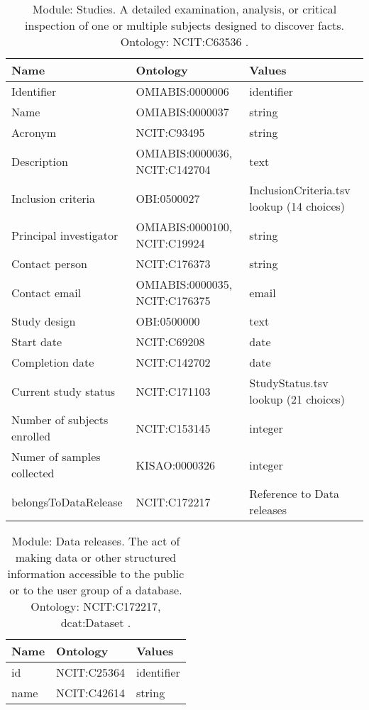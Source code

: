 \documentclass{article}
\begin{document}
\begin{table}[htb]
\begin{tabular}{lll}
Name & Ontology & Values \\
\hline
Identifier & OMIABIS:0000006  & identifier \\
Name & OMIABIS:0000037  & string \\
Acronym & NCIT:C93495  & string \\
Description & OMIABIS:0000036, NCIT:C142704  & text \\
Inclusion criteria & OBI:0500027  & InclusionCriteria.tsv lookup (14 choices) \\
Principal investigator & OMIABIS:0000100, NCIT:C19924  & string \\
Contact person & NCIT:C176373  & string \\
Contact email & OMIABIS:0000035, NCIT:C176375  & email \\
Study design & OBI:0500000  & text \\
Start date & NCIT:C69208  & date \\
Completion date & NCIT:C142702  & date \\
Current study status & NCIT:C171103  & StudyStatus.tsv lookup (21 choices) \\
Number of subjects enrolled & NCIT:C153145  & integer \\
Numer of samples collected & KISAO:0000326  & integer \\
belongsToDataRelease & NCIT:C172217  & Reference to Data releases \\
\hline
\end{tabular}
\caption[Module: Studies]{\label{table:table2} Module: Studies. A detailed examination, analysis, or critical inspection of one or multiple subjects designed to discover facts. Ontology: NCIT:C63536 . }
\end{table}

\begin{table}[htb]
\begin{tabular}{lll}
Name & Ontology & Values \\
\hline
id & NCIT:C25364  & identifier \\
name & NCIT:C42614  & string \\
\hline
\end{tabular}
\caption[Module: Data releases]{\label{table:table3} Module: Data releases. The act of making data or other structured information accessible to the public or to the user group of a database. Ontology: NCIT:C172217, dcat:Dataset . }
\end{table}
\end{document}

